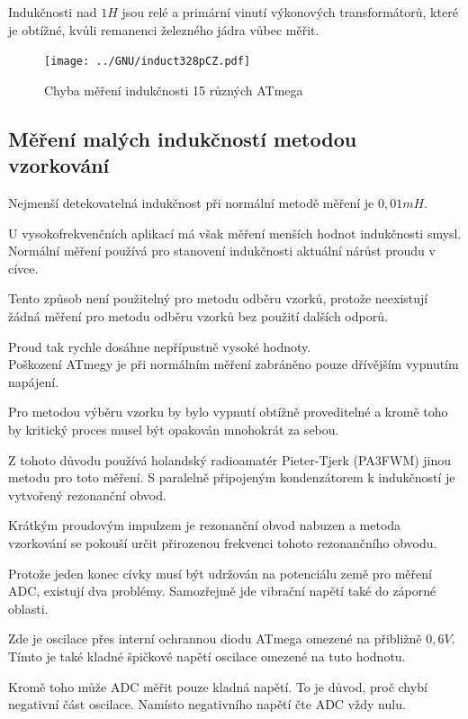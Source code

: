 Indukčnosti nad \(1 H\) jsou relé a primární vinutí výkonových transformátorů, které je obtížné, kvůli
remanenci železného jádra vůbec měřit.

\begin{figure}[H]
\centering
\texttt{[image: ../GNU/induct328pCZ.pdf]}
\caption{Chyba měření indukčnosti 15 různých ATmega}
\label{fig:Induct328p}
\end{figure}

\subsection{Měření malých indukčností metodou vzorkování}

Nejmenší detekovatelná indukčnost při normální metodě měření je \(0,01mH\).

U vysokofrekvenčních aplikací má však měření menších hodnot indukčnosti smysl.\\
Normální měření používá pro stanovení indukčnosti aktuální nárůst proudu v cívce.

Tento způsob není použitelný pro metodu odběru vzorků, protože neexistují žádná měření pro metodu odběru vzorků
bez použití dalších odporů.

Proud tak rychle dosáhne nepřípustně vysoké hodnoty.\\ Poškození ATmegy je při normálním měření zabráněno pouze
dřívějším vypnutím napájení.

Pro metodou výběru vzorku by bylo vypnutí obtížně proveditelné a kromě toho by kritický proces musel být opakován mnohokrát za sebou.

Z tohoto důvodu používá holandský radioamatér Pieter-Tjerk (PA3FWM) jinou metodu pro toto měření. S paralelně připojeným kondenzátorem k indukčností je vytvořený rezonanční obvod.

Krátkým proudovým impulzem je rezonanční obvod nabuzen a metoda vzorkování se pokouší určit přirozenou frekvenci tohoto rezonančního obvodu.

Protože jeden konec cívky musí být udržován na potenciálu země pro měření ADC,
existují dva problémy. Samozřejmě jde vibrační napětí také do záporné oblasti.

Zde je oscilace přes interní ochrannou diodu ATmega omezené na přibližně \(0,6V\). Tímto je také kladné špičkové napětí oscilace omezené na tuto hodnotu.

Kromě toho může ADC měřit pouze kladná napětí.
To je důvod, proč chybí negativní část oscilace. Namísto negativního napětí čte ADC vždy nulu.

